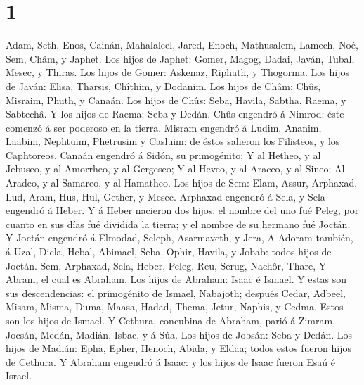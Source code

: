 \hypertarget{section}{%
\section{1}\label{section}}

 Adam, Seth, Enos,  Cainán, Mahalaleel,
Jared,  Enoch, Mathusalem, Lamech,  Noé,
Sem, Châm, y Japhet.  Los hijos de Japhet: Gomer, Magog,
Dadai, Javán, Tubal, Mesec, y Thiras.  Los hijos de Gomer:
Askenaz, Riphath, y Thogorma.  Los hijos de Javán: Elisa,
Tharsis, Chîthim, y Dodanim.  Los hijos de Châm: Chûs,
Misraim, Phuth, y Canaán.  Los hijos de Chûs: Seba,
Havila, Sabtha, Raema, y Sabtechâ. Y los hijos de Raema: Seba y Dedán.
 Chûs engendró á Nimrod: éste comenzó á ser poderoso en
la tierra.  Misram engendró á Ludim, Ananim, Laabim,
Nephtuim,  Phetrusim y Casluim: de éstos salieron los
Filisteos, y los Caphtoreos.  Canaán engendró á Sidón, su
primogénito;  Y al Hetheo, y al Jebuseo, y al Amorrheo, y
al Gergeseo;  Y al Heveo, y al Araceo, y al Sineo;
 Al Aradeo, y al Samareo, y al Hamatheo. 
Los hijos de Sem: Elam, Assur, Arphaxad, Lud, Aram, Hus, Hul, Gether, y
Mesec.  Arphaxad engendró á Sela, y Sela engendró á
Heber.  Y á Heber nacieron dos hijos: el nombre del uno
fué Peleg, por cuanto en sus días fué dividida la tierra; y el nombre de
su hermano fué Joctán.  Y Joctán engendró á Elmodad,
Seleph, Asarmaveth, y Jera,  A Adoram también, á Uzal,
Dicla,  Hebal, Abimael, Seba,  Ophir,
Havila, y Jobab: todos hijos de Joctán.  Sem, Arphaxad,
Sela,  Heber, Peleg, Reu,  Serug, Nachôr,
Thare,  Y Abram, el cual es Abraham.  Los
hijos de Abraham: Isaac é Ismael.  Y estas son sus
descendencias: el primogénito de Ismael, Nabajoth; después Cedar,
Adbeel, Misam,  Misma, Duma, Maasa, Hadad, Thema, Jetur,
Naphis, y Cedma. Estos son los hijos de Ismael.  Y
Cethura, concubina de Abraham, parió á Zimram, Jocsán, Medán, Madián,
Isbac, y á Súa.  Los hijos de Jobsán: Seba y Dedán.
 Los hijos de Madián: Epha, Epher, Henoch, Abida, y
Eldaa; todos estos fueron hijos de Cethura.  Y Abraham
engendró á Isaac: y los hijos de Isaac fueron Esaú é Israel.
